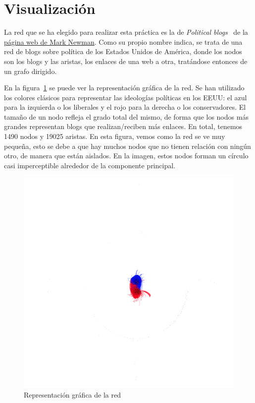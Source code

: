 \section{Visualización}
La red que se ha elegido para realizar esta práctica es la de \textit{Political
blogs}~\cite{data} de la
\href{http://www-personal.umich.edu/~mejn/netdata/}{página web de
Mark Newman}. Como su propio nombre indica, se trata de una red de blogs sobre
política de los Estados Unidos de América, donde los nodos son los blogs y las
aristas, los enlaces de una web a otra, tratándose entonces de un grafo
dirigido.

En la figura~\ref{fig:network-parties} se puede ver la representación gráfica de
la red. Se han utilizado los colores clásicos para representar las ideologías
políticas en los EEUU: el azul para la izquierda o los liberales y el rojo para
la derecha o los conservadores. El tamaño de un nodo refleja el grado total del
mismo, de forma que los nodos más grandes representan blogs que realizan/reciben
más enlaces. En total, tenemos 1490 nodos y 19025 aristas. En esta figura, vemos
como la red se ve muy pequeña, esto se debe a que hay muchos nodos que no tienen
relación con ningún otro, de manera que están aislados. En la imagen, estos
nodos forman un círculo casi imperceptible alrededor de la componente principal.

\begin{figure}
    \includegraphics[width=\textwidth]{images/visualization/network/parties.png}
    \caption{Representación gráfica de la red}
    \label{fig:network-parties}
\end{figure}

